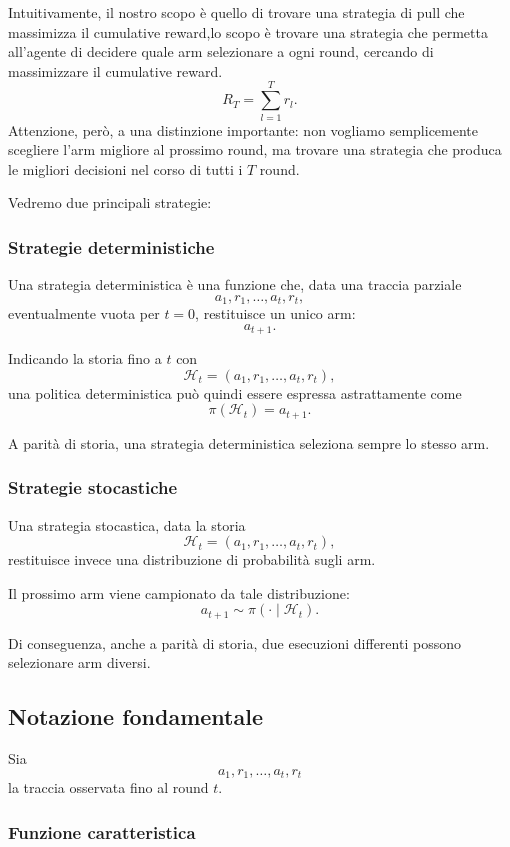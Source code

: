 Intuitivamente, il nostro scopo è quello di trovare una strategia di pull che massimizza il cumulative reward,lo scopo è trovare una strategia che permetta all'agente di decidere quale arm selezionare a ogni round, cercando di massimizzare il cumulative reward.
\[
R_T=\sum_{l=1}^{T}r_l.
\]
Attenzione, però, a una distinzione importante: non vogliamo semplicemente scegliere l'arm migliore al prossimo round, ma trovare una strategia che produca le migliori decisioni nel corso di tutti i \(T\) round.


Vedremo due principali strategie:

\subsubsection{Strategie deterministiche}

Una strategia deterministica è una funzione che, data una traccia parziale
\[
a_1,r_1,\ldots,a_t,r_t,
\]
eventualmente vuota per $t=0$, restituisce un unico arm:
\[
a_{t+1}.
\]

Indicando la storia fino a $t$ con
\[
\mathcal{H}_t=(a_1,r_1,\ldots,a_t,r_t),
\]
una politica deterministica può quindi essere espressa astrattamente come
\[
\pi(\mathcal{H}_t)=a_{t+1}.
\]

A parità di storia, una strategia deterministica seleziona sempre lo stesso arm.

\subsubsection{Strategie stocastiche}

Una strategia stocastica, data la storia
\[
\mathcal{H}_t=(a_1,r_1,\ldots,a_t,r_t),
\]
restituisce invece una distribuzione di probabilità sugli arm.

Il prossimo arm viene campionato da tale distribuzione:
\[
a_{t+1}\sim \pi(\cdot\mid\mathcal{H}_t).
\]

Di conseguenza, anche a parità di storia, due esecuzioni differenti possono selezionare arm diversi.

\subsection{Notazione fondamentale}

Sia
\[
a_1,r_1,\ldots,a_t,r_t
\]
la traccia osservata fino al round $t$.

\subsubsection{Funzione caratteristica}

